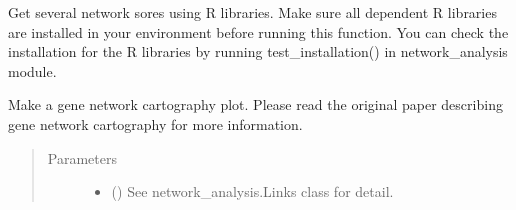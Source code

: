 \documentclass[letterpaper,10pt,english]{sphinxmanual}
\begin{document}
\begin{fulllineitems}
\begin{fulllineitems}
\begin{quote}
\begin{description}
\end{description}\end{quote}

\end{fulllineitems}


\begin{fulllineitems}
\label{\detokenize{modules/celloracle:celloracle.Links.get_score}}
Get several network sores using R libraries.
Make sure all dependent R libraries are installed in your environment before running this function.
You can check the installation for the R libraries by running test\_installation() in network\_analysis module.

\end{fulllineitems}


\begin{fulllineitems}
\label{\detokenize{modules/celloracle:celloracle.Links.plot_cartography_scatter_per_cluster}}
Make a gene network cartography plot.
Please read the original paper describing gene network cartography for more information.
\begin{quote}\begin{description}
\item[{Parameters}] \leavevmode\begin{itemize}
\item {} 
 ({\hyperref[\detokenize{modules/celloracle:celloracle.Links}]{}}) \textendash{} See network\_analysis.Links class for detail.


\end{itemize}
\end{description}
\end{quote}
\end{fulllineitems}
\end{fulllineitems}
\end{document}
